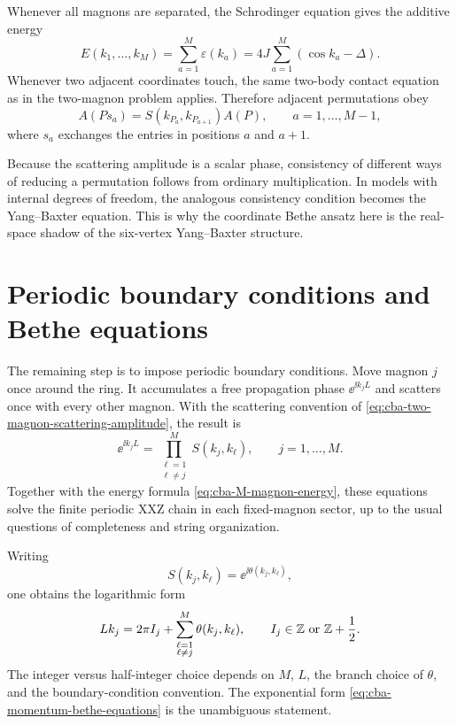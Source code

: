 Whenever all magnons are separated, the Schrodinger equation gives the additive
energy
\begin{equation}
\label{eq:cba-M-magnon-energy}
    E(k_1,
    \ldots,k_M)
    =
    \sum_{a=1}^{M}\varepsilon(k_a)
    =
    4J\sum_{a=1}^{M}(\cos k_a-\Delta).
\end{equation}
Whenever two adjacent coordinates touch, the same two-body contact equation as in
the two-magnon problem applies.  Therefore adjacent permutations obey
\begin{equation}
\label{eq:cba-adjacent-permutation-relation}
    A(Ps_a)
    =
    S(k_{P_a},k_{P_{a+1}})A(P),
    \qquad
    a=1,\ldots,M-1,
\end{equation}
where $s_a$ exchanges the entries in positions $a$ and $a+1$.

Because the scattering amplitude is a scalar phase, consistency of different
ways of reducing a permutation follows from ordinary multiplication.  In models
with internal degrees of freedom, the analogous consistency condition becomes the
Yang--Baxter equation.  This is why the coordinate Bethe ansatz here is the
real-space shadow of the six-vertex Yang--Baxter structure.

\section{Periodic boundary conditions and Bethe equations}
\label{sec:cba-bethe-equations-momentum-form}

The remaining step is to impose periodic boundary conditions.  Move magnon $j$
once around the ring.  It accumulates a free propagation phase $\ee^{\ii k_jL}$
and scatters once with every other magnon.  With the scattering convention of
\cref{eq:cba-two-magnon-scattering-amplitude}, the result is
\begin{equation}
\label{eq:cba-momentum-bethe-equations}
    \ee^{\ii k_jL}
    =
    \prod_{\substack{\ell=1\\ \ell\neq j}}^{M}
    S(k_j,k_\ell),
    \qquad
    j=1,\ldots,M .
\end{equation}
Together with the energy formula \cref{eq:cba-M-magnon-energy}, these equations
solve the finite periodic XXZ chain in each fixed-magnon sector, up to the usual
questions of completeness and string organization.

Writing
\begin{equation}
    S(k_j,k_\ell)=\ee^{\ii\theta(k_j,k_\ell)},
\end{equation}
one obtains the logarithmic form
\begin{equation}
\label{eq:cba-logarithmic-bethe-equations}
    Lk_j
    =
    2\pi I_j
    +
    \sum_{\substack{\ell=1\\ \ell\neq j}}^{M}
    \theta(k_j,k_\ell),
    \qquad
    I_j\in\mathbb{Z}\ \text{or}\ \mathbb{Z}+\frac12 .
\end{equation}
The integer versus half-integer choice depends on $M$, $L$, the branch choice of
$\theta$, and the boundary-condition convention.  The exponential form
\cref{eq:cba-momentum-bethe-equations} is the unambiguous statement.

